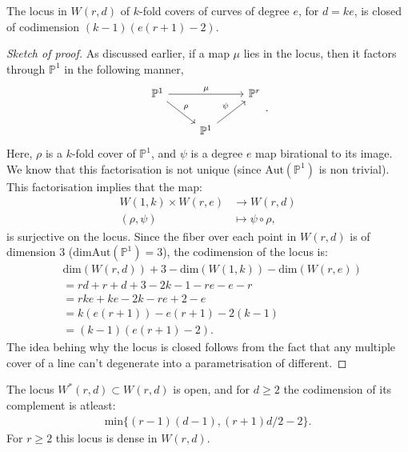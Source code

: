 \begin{lemma}
    The locus in $W(r,d)$ of $k$-fold covers of curves of degree $e$, for $d = ke$, is closed of codimension $(k-1)(e(r+1)-2)$.
\end{lemma}
\begin{proof}[Sketch of proof]
    As discussed earlier, if a map $\mu$ lies in the locus, then it factors through $\mathbb{P}^{1}$ in the following manner,
    \[
        \begin{tikzcd}
            \mathbb{P}^{1} & & \mathbb{P}^{r}\\
                           & \mathbb{P}^{1} &
            \arrow["\mu", from = 1-1, to = 1-3]
            \arrow["\rho", from = 1-1, to = 2-2]
            \arrow["\psi", from = 2-2, to = 1-3]
        \end{tikzcd}.
    \]
    Here, $\rho$ is a $k$-fold cover of $\mathbb{P}^{1}$, and $\psi$ is a degree $e$ map birational to its image. We know that this factorisation is not unique (since $\text{Aut}(\mathbb{P}^{1})$ is non trivial).
    This factorisation implies that the map:
    \begin{align*}
        W(1,k) \times W(r,e) &\to W(r,d)\\
        (\rho, \psi) &\mapsto \psi \circ \rho,
    \end{align*}
    is surjective on the locus. 
    Since the fiber over each point in $W(r,d)$ is of dimension $3$ ($\text{dim}\text{Aut}(\mathbb{P}^{1}) = 3$), the codimension of the locus is:
    \begin{align*}
        &\text{dim}(W(r,d)) + 3 - \text{dim}(W(1,k)) - \text{dim}(W(r,e))\\
        &= rd + r + d + 3 - 2k - 1 - re - e -r\\
        &= rke + ke - 2k - re + 2 -e\\
        &= k(e(r+1)) - e(r+1) -2 (k-1)\\
        &= (k-1)(e(r+1) -2).
    \end{align*}
    The idea behing why the locus is closed follows from the fact that any multiple cover of a line can't degenerate into a parametrisation of different.
\end{proof}

\begin{proposition}
    \label{birDim}
    The locus $W^{*}(r,d) \subset W(r,d)$ is open, and for $d \geq 2$ the codimension of its complement is atleast:
    \begin{align*}
        \text{min}\{(r-1)(d-1),(r+1)d/2 - 2\}.
    \end{align*}
    For $r \geq 2$ this locus is dense in $W(r,d)$.
\end{proposition}

